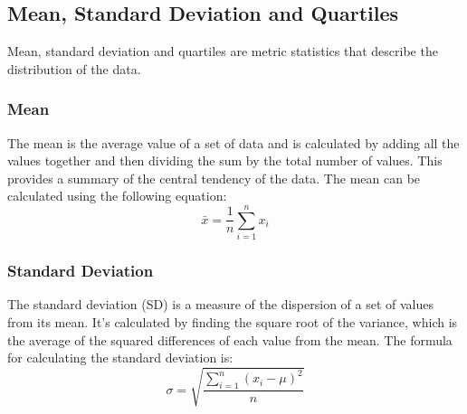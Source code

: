 \documentclass{report}
\begin{document}
\subsection{Mean, Standard Deviation and Quartiles}
Mean, standard deviation and quartiles are metric statistics that describe the distribution of the data. 
\subsubsection{Mean}

The mean is the average value of a set of data and is calculated by adding all the values together and then dividing the sum by the total number of values. This provides a summary of the central tendency of the data. The mean can be calculated using the following equation:
\begin{equation}
    \bar{x} = \frac{1}{n}\sum_{i=1}^{n}x_i
\end{equation}


\subsubsection{Standard Deviation}

The standard deviation (SD) is a measure of the dispersion of a set of values from its mean. It's calculated by finding the square root of the variance, which is the average of the squared differences of each value from the mean. The formula for calculating the standard deviation is:
\begin{equation}
    \sigma = \sqrt{\frac{\sum_{i=1}^{n}(x_i - \mu)^2}{n}}
\end{equation}
\end{document}
